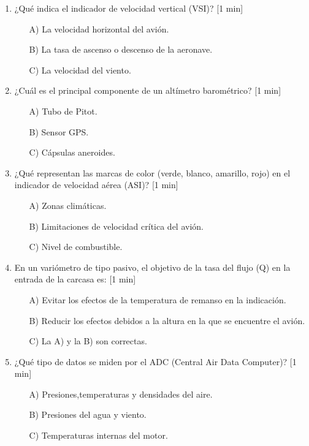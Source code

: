 \begin{enumerate}
\item  ¿Qué indica el indicador de velocidad vertical (VSI)? [1 min]
    \begin{itemize}
    \item[A)] La velocidad horizontal del avión.
    \item[B)] La tasa de ascenso o descenso de la aeronave.
    \item[C)] La velocidad del viento.\\
    \end{itemize}

\item ¿Cuál es el principal componente de un altímetro barométrico? [1 min]
    \begin{itemize}
    \item[A)] Tubo de Pitot.
    \item[B)] Sensor GPS.
    \item[C)] Cápsulas aneroides.\\
    \end{itemize}

\item ¿Qué representan las marcas de color (verde, blanco, amarillo, rojo) en el indicador de velocidad aérea (ASI)? [1 min]
     \begin{itemize}
    \item[A)] Zonas climáticas.
    \item[B)] Limitaciones de velocidad crítica del avión.
    \item[C)] Nivel de combustible.\\
    \end{itemize}
    
\item En un variómetro de tipo pasivo, el objetivo de la tasa del flujo (Q) en la entrada de la carcasa es: [1 min]
     \begin{itemize}
	\item[A)] Evitar los efectos de la temperatura de remanso en la indicación.
	\item[B)] Reducir los efectos debidos a la altura en la que se encuentre el avión.
	\item[C)] La A) y la B) son correctas.\\
\end{itemize}

\item ¿Qué tipo de datos se miden por el ADC (Central Air Data Computer)? [1 min] 
    \begin{itemize}
    \item[A)] Presiones,temperaturas y densidades del aire. 
    \item[B)] Presiones del agua y viento.
    \item[C)] Temperaturas internas del motor.\\
    \end{itemize}


\end{enumerate}
